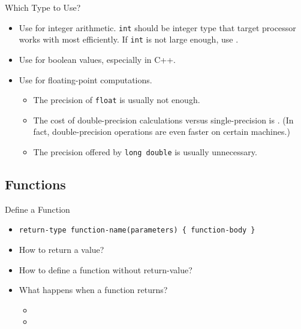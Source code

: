 \documentclass[handout]{beamer}
\begin{document}
\begin{frame}{Which Type to Use?}
    \begin{itemize}
        \item Use  for integer arithmetic. \texttt{int} should be integer type that target processor works with most efficiently. If \texttt{int} is not large enough, use .
        \item Use  for boolean values, especially in C++.
        \item Use  for floating-point computations.
        \pause
        \begin{itemize}
            \item The precision of \texttt{float} is usually not enough.
            \item The cost of double-precision calculations versus single-precision is . (In fact, double-precision operations are even faster on certain machines.)
            \item The precision offered by \texttt{long double} is usually unnecessary.
        \end{itemize}
    \end{itemize}
\end{frame}

\subsection{Functions}

\begin{frame}{Define a Function}
    \begin{itemize}
        \item \texttt{return-type function-name(parameters) \{ function-body \}}
        \item How to return a value?\\
        \pause
        \pause
        \item How to define a function without return-value?\\
        \pause
        \pause
        \item What happens when a function returns?
        \pause
        \begin{itemize}
            \item {}
            \item {}
        \end{itemize}
    \end{itemize}
\end{frame}
\end{document}
